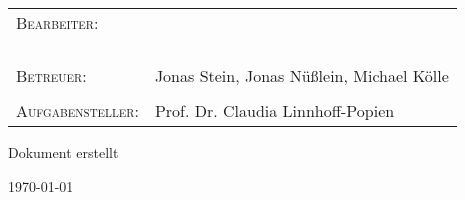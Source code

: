 \documentclass{article}
\numberwithin{equation}{section}
\begin{document}


\let\oldcontentsname\contentsname
\renewcommand{\contentsname}{\centering\small\oldcontentsname}

\title{\thesistitle}
\author{\authorA {} \authorB}
\date{\today}

\begin{titlepage}
	\centering
    \vspace*{-\topmargin}\vspace{-1in}%
    \vspace*{-\headheight}\vspace{-\headsep}%
    \vspace*{-\topskip}%
    \hspace*{-\oddsidemargin}
    \hspace*{-\marginparsep}
    \hspace*{-\marginparwidth}
	\vspace*{1.75cm}
	\par
	{\scshape\large \practical\par}
	{\huge\bfseries\thesistitle\par}
	\vspace*{1.75cm}
	\large \begin{tabular}{ l l }
	  \textsc{Bearbeiter}:&{\authorA}\\
	  &{\authorB}\\
	  &{\authorC}\\
	  &{\authorD}\\
	  \\
	  \textsc{Betreuer:}&{Jonas Stein, Jonas Nüßlein, Michael Kölle}\\
	  \\
	  \textsc{Aufgabensteller:}&{Prof. Dr. Claudia Linnhoff-Popien}\\
	\end{tabular}
	\par
	\vspace*{1.75cm}
	\begin{otherlanguage}{ngerman}
		{\large Dokument erstellt\par\today\par}
	\end{otherlanguage}
	\newpage
	\thispagestyle{empty}
	\mbox{}
	\newpage
\end{titlepage}
\cleardoublepage

\begin{center}
	\LARGE
	\thesistitle
\end{center} 
\vspace*{.75cm}
\begin{abstract}
\noindent\thesisabstract
\end{abstract}
\vspace*{.75cm}
\tableofcontents
\newpage
\thispagestyle{empty}
\mbox{}
\newpage
\cleardoublepage



\section*{}
\thesisauthorship



\end{document}
